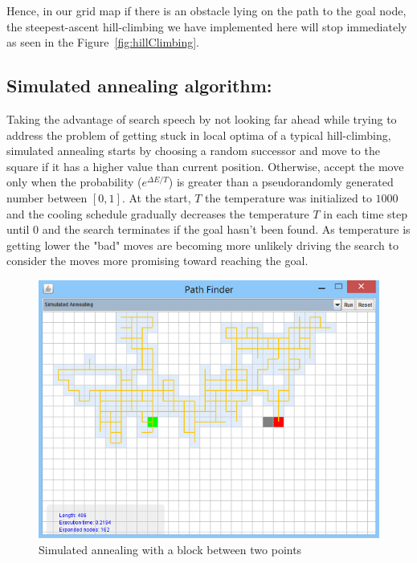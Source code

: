 \documentclass[a4paper]{article}
\begin{document}
Hence, in our grid map if there is an obstacle lying on the path to the goal node, the steepest-ascent hill-climbing we have implemented here will stop immediately as seen in the Figure~\ref{fig:hillClimbing}.


\subsection{Simulated annealing algorithm:}

Taking the advantage of search speech by not looking far ahead while trying to address the problem of getting stuck in local optima of a typical hill-climbing, simulated annealing starts by choosing a random successor and move to the square if it has a higher value than current position. Otherwise, accept the move only when the probability ($e^{\Delta E/T}$) is greater than a pseudorandomly generated number between $[0, 1]$. At the start, $T$ the temperature was initialized to $1000$ and the cooling schedule gradually decreases the temperature $T$ in each time step until $0$ and the search terminates if the goal hasn't been found. As temperature is getting lower the "bad" moves are becoming more unlikely driving the search to consider the moves more promising toward reaching the goal. \\

\begin{figure}[h!]
  \centering
    \includegraphics[scale=.9]{images/sa1.png}
  \caption{Simulated annealing with a block between two points}
  \label{fig:simulatedAnnealing}
\end{figure}
\end{document}

